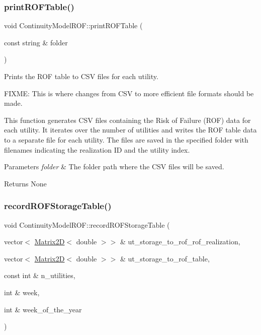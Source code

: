 \subsubsection{\texorpdfstring{print\+R\+O\+F\+Table()}{printROFTable()}}
{\footnotesize\ttfamily void Continuity\+Model\+R\+O\+F\+::print\+R\+O\+F\+Table (\begin{DoxyParamCaption}\item[{const string \&}]{folder }\end{DoxyParamCaption})}



Prints the R\+OF table to C\+SV files for each utility. 

F\+I\+X\+ME\+: This is where changes from C\+SV to more efficient file formats should be made.

This function generates C\+SV files containing the Risk of Failure (R\+OF) data for each utility. It iterates over the number of utilities and writes the R\+OF table data to a separate file for each utility. The files are saved in the specified folder with filenames indicating the realization ID and the utility index.


\begin{DoxyParams}{Parameters}
{\em folder} & The folder path where the C\+SV files will be saved.\\
\hline
\end{DoxyParams}
\begin{DoxyReturn}{Returns}
None 
\end{DoxyReturn}
\mbox{\label{classContinuityModelROF_aa2348a2a5dea751462771ef538243e75}} 
\subsubsection{\texorpdfstring{record\+R\+O\+F\+Storage\+Table()}{recordROFStorageTable()}}
{\footnotesize\ttfamily void Continuity\+Model\+R\+O\+F\+::record\+R\+O\+F\+Storage\+Table (\begin{DoxyParamCaption}\item[{vector$<$ \mbox{\hyperlink{classMatrix2D}{Matrix2D}}$<$ double $>$$>$ \&}]{ut\+\_\+storage\+\_\+to\+\_\+rof\+\_\+rof\+\_\+realization,  }\item[{vector$<$ \mbox{\hyperlink{classMatrix2D}{Matrix2D}}$<$ double $>$$>$ \&}]{ut\+\_\+storage\+\_\+to\+\_\+rof\+\_\+table,  }\item[{const int \&}]{n\+\_\+utilities,  }\item[{int \&}]{week,  }\item[{int \&}]{week\+\_\+of\+\_\+the\+\_\+year }\end{DoxyParamCaption})}



